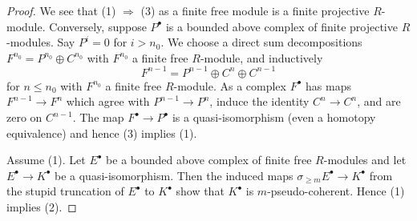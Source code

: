 \documentclass[10pt,a4paper]{amsart}
\theoremstyle{plain}
\theoremstyle{definition}
\theoremstyle{remark}
\numberwithin{equation}{subsection}
\begin{document}
\begin{proof}
We see that (1) $\Rightarrow$ (3) as a finite free module is a finite
projective $R$-module. Conversely, suppose $P^\bullet$ is a bounded
above complex of finite projective $R$-modules. Say $P^i = 0$ for
$i > n_0$. We choose a direct sum decompositions
$F^{n_0} = P^{n_0} \oplus C^{n_0}$ with $F^{n_0}$ a finite free
$R$-module, and inductively
$$
F^{n - 1} = P^{n - 1} \oplus C^n \oplus C^{n - 1}
$$
for $n \leq n_0$ with $F^{n_0}$ a finite free $R$-module. As a complex
$F^\bullet$ has maps $F^{n - 1} \to F^n$ which agree with $P^{n - 1} \to P^n$,
induce the identity $C^n \to C^n$, and are zero on $C^{n - 1}$. The map
$F^\bullet \to P^\bullet$ is a quasi-isomorphism (even a homotopy equivalence)
and hence (3) implies (1).

\medskip\noindent
Assume (1). Let $E^\bullet$ be a bounded above complex of finite free
$R$-modules and let $E^\bullet \to K^\bullet$ be a
quasi-isomorphism. Then the induced maps
$\sigma_{\geq m}E^\bullet \to K^\bullet$ from the stupid truncation
of $E^\bullet$ to $K^\bullet$ show that $K^\bullet$ is $m$-pseudo-coherent.
Hence (1) implies (2).


\end{proof}
\end{document}
